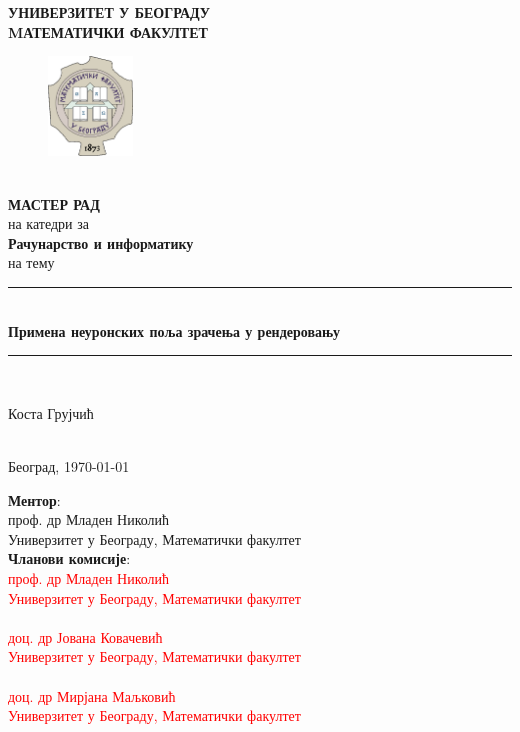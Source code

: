 \documentclass[12pt, a4paper, twoside]{book}
\numberwithin{equation}{chapter}
\numberwithin{theorem}{section}
\numberwithin{definition}{section}
\numberwithin{definitionChapter}{chapter}
\begin{document}
	
\begin{titlepage}
	\newcommand{\HRule}{\rule{\linewidth}{0.5mm}}
	\center
	
	\textbf{\LARGE УНИВЕРЗИТЕТ У БЕОГРАДУ\\MАТЕМАТИЧКИ ФАКУЛТЕТ}
	\begin{figure}[!ht]
		\centering
		\includegraphics[width=0.2\textwidth]{img/matf-logo.png}
	\end{figure}\\[3cm]
	\textbf{\Large МАСТЕР РАД}\\[0.3cm]
	на катедри за \\[0.3cm]
	\textbf{\Large Рачунарство и информатику}\\[.7cm] %
	на тему\\[0.7cm]
	
	\HRule \\[0.4cm]
	{ \huge \bfseries Примена неуронских поља зрачења у рендеровању}\\[0.4cm] %
	\HRule \\[1.5cm]
	
	\begin{minipage}{0.4\textwidth}
		\begin{center}
			Коста Грујчић
		\end{center}
	\end{minipage}\\[5cm]
	
	{\large Београд, \today}\\[2.5cm]
	\vfill
\end{titlepage}

\newpage
\thispagestyle{empty}

\hspace{0pt}
\vfill
\noindent \textbf{Ментор}:\\
проф. др Младен Николић\\Универзитет у Београду, Математички факултет
\\[2cm]

\noindent \textbf{Чланови комисије}:
\textcolor{red}{
\\проф. др Младен Николић\\Универзитет у Београду, Математички факултет
\\[0.25cm]
\\доц. др Јована Ковачевић\\Универзитет у Београду, Математички факултет
\\[0.25cm]
\\доц. др Мирјана Маљковић\\Универзитет у Београду, Математички факултет
\\[2cm]
}
\end{document}
